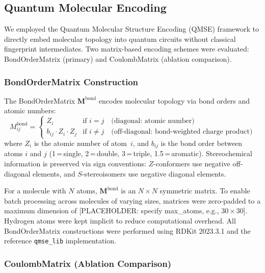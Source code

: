 \subsection{Quantum Molecular Encoding}
\label{sec:methods:encoding}

We employed the Quantum Molecular Structure Encoding (QMSE) framework\cite{Boy2025QMSE} to directly embed molecular topology into quantum circuits without classical fingerprint intermediates. Two matrix-based encoding schemes were evaluated: BondOrderMatrix (primary) and CoulombMatrix (ablation comparison).

\subsubsection{BondOrderMatrix Construction}

The BondOrderMatrix $\mathbf{M}^{\text{bond}}$ encodes molecular topology via bond orders and atomic numbers:\cite{Boy2025QMSE}
%
\begin{equation}
M^{\text{bond}}_{ij} = 
\begin{cases}
Z_i & \text{if } i = j \quad \text{(diagonal: atomic number)} \\
b_{ij} \cdot Z_i \cdot Z_j & \text{if } i \neq j \quad \text{(off-diagonal: bond-weighted charge product)}
\end{cases}
\label{eq:bondordermatrix}
\end{equation}
%
where $Z_i$ is the atomic number of atom~$i$, and $b_{ij}$ is the bond order between atoms $i$ and $j$ (1\,=\,single, 2\,=\,double, 3\,=\,triple, 1.5\,=\,aromatic). Stereochemical information is preserved via sign conventions: $Z$-conformers use negative off-diagonal elements, and $S$-stereoisomers use negative diagonal elements.\cite{Boy2025QMSE}

For a molecule with $N$ atoms, $\mathbf{M}^{\text{bond}}$ is an $N \times N$ symmetric matrix. To enable batch processing across molecules of varying sizes, matrices were zero-padded to a maximum dimension of [PLACEHOLDER: specify max\_atoms, e.g., 30\,$\times$\,30]. Hydrogen atoms were kept implicit to reduce computational overhead. All BondOrderMatrix constructions were performed using RDKit 2023.3.1\cite{RDKit2023} and the reference \texttt{qmse\_lib} implementation.\cite{Boy2025QMSE}

\subsubsection{CoulombMatrix (Ablation Comparison)}

